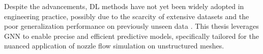 Despite the advancements, DL methods have not yet been widely adopted in engineering practice, possibly due to the scarcity of extensive datasets and the poor generalization performance on previously unseen data \cite{brenner2019perspective}. This thesis leverages \gls{GNN} to enable precise and efficient predictive models, specifically tailored for the nuanced application of nozzle flow simulation on unstructured meshes.
